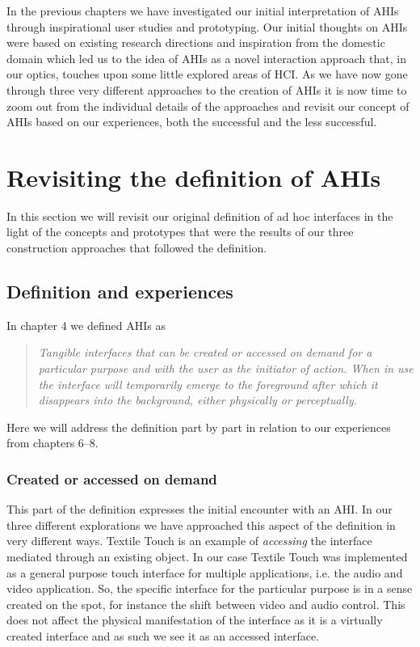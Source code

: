 In the previous chapters we have investigated our initial interpretation of AHIs through inspirational user studies and prototyping.
Our initial thoughts on AHIs were based on existing research directions and inspiration from the domestic domain which led us to the idea of AHIs as a novel interaction approach that, in our optics, touches upon some little explored areas of HCI.  
As we have now gone through three very different approaches to the creation of AHIs it is now time to zoom out from the individual details of the approaches and revisit our concept of AHIs based on our experiences, both the successful and the less successful.

\section{Revisiting the definition of AHIs}
In this section we will revisit our original definition of ad hoc interfaces in the light of the concepts and prototypes that were the results of our three construction approaches that followed the definition.

\subsection{Definition and experiences}
In chapter 4 we defined AHIs as
\begin{quotation}
\emph{Tangible interfaces that can be created or accessed on demand for a particular purpose and with the user as the initiator of action. When in use the interface will temporarily emerge to the foreground after which it disappears into the background, either physically or perceptually.}
\end{quotation}
Here we will address the definition part by part in relation to our experiences from chapters 6--8.

\subsubsection{Created or accessed on demand}
This part of the definition expresses the initial encounter with an AHI.
In our three different explorations we have approached this aspect of the definition in very different ways.
Textile Touch is an example of \emph{accessing} the interface mediated through an existing object.
In our case Textile Touch was implemented as a general purpose touch interface for multiple applications, i.e. the audio and video application.
So, the specific interface for the particular purpose is in a sense created on the spot, for instance the shift between video and audio control.
This does not affect the physical manifestation of the interface as it is a virtually created interface and as such we see it as an accessed interface.

